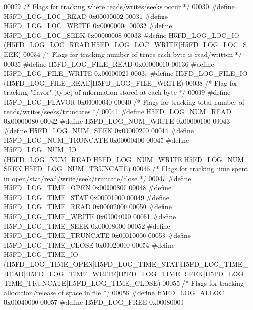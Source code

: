 \begin{DoxyCode}
00029 \textcolor{comment}{/* Flags for tracking where reads/writes/seeks occur */}
00030 \textcolor{preprocessor}{#define H5FD\_LOG\_LOC\_READ   0x00000002}
00031 \textcolor{preprocessor}{#define H5FD\_LOG\_LOC\_WRITE  0x00000004}
00032 \textcolor{preprocessor}{#define H5FD\_LOG\_LOC\_SEEK   0x00000008}
00033 \textcolor{preprocessor}{#define H5FD\_LOG\_LOC\_IO     (H5FD\_LOG\_LOC\_READ|H5FD\_LOG\_LOC\_WRITE|H5FD\_LOG\_LOC\_SEEK)}
00034 \textcolor{comment}{/* Flags for tracking number of times each byte is read/written */}
00035 \textcolor{preprocessor}{#define H5FD\_LOG\_FILE\_READ  0x00000010}
00036 \textcolor{preprocessor}{#define H5FD\_LOG\_FILE\_WRITE 0x00000020}
00037 \textcolor{preprocessor}{#define H5FD\_LOG\_FILE\_IO    (H5FD\_LOG\_FILE\_READ|H5FD\_LOG\_FILE\_WRITE)}
00038 \textcolor{comment}{/* Flag for tracking "flavor" (type) of information stored at each byte */}
00039 \textcolor{preprocessor}{#define H5FD\_LOG\_FLAVOR     0x00000040}
00040 \textcolor{comment}{/* Flags for tracking total number of reads/writes/seeks/truncates */}
00041 \textcolor{preprocessor}{#define H5FD\_LOG\_NUM\_READ   0x00000080}
00042 \textcolor{preprocessor}{#define H5FD\_LOG\_NUM\_WRITE  0x00000100}
00043 \textcolor{preprocessor}{#define H5FD\_LOG\_NUM\_SEEK   0x00000200}
00044 \textcolor{preprocessor}{#define H5FD\_LOG\_NUM\_TRUNCATE 0x00000400}
00045 \textcolor{preprocessor}{#define H5FD\_LOG\_NUM\_IO     (H5FD\_LOG\_NUM\_READ|H5FD\_LOG\_NUM\_WRITE|H5FD\_LOG\_NUM\_SEEK|H5FD\_LOG\_NUM\_TRUNCATE)}
00046 \textcolor{comment}{/* Flags for tracking time spent in open/stat/read/write/seek/truncate/close */}
00047 \textcolor{preprocessor}{#define H5FD\_LOG\_TIME\_OPEN  0x00000800}
00048 \textcolor{preprocessor}{#define H5FD\_LOG\_TIME\_STAT  0x00001000}
00049 \textcolor{preprocessor}{#define H5FD\_LOG\_TIME\_READ  0x00002000}
00050 \textcolor{preprocessor}{#define H5FD\_LOG\_TIME\_WRITE 0x00004000}
00051 \textcolor{preprocessor}{#define H5FD\_LOG\_TIME\_SEEK  0x00008000}
00052 \textcolor{preprocessor}{#define H5FD\_LOG\_TIME\_TRUNCATE 0x00010000}
00053 \textcolor{preprocessor}{#define H5FD\_LOG\_TIME\_CLOSE 0x00020000}
00054 \textcolor{preprocessor}{#define H5FD\_LOG\_TIME\_IO   
       (H5FD\_LOG\_TIME\_OPEN|H5FD\_LOG\_TIME\_STAT|H5FD\_LOG\_TIME\_READ|H5FD\_LOG\_TIME\_WRITE|H5FD\_LOG\_TIME\_SEEK|H5FD\_LOG\_TIME\_TRUNCATE|H5FD\_LOG\_TIME\_CLOSE)}
00055 \textcolor{comment}{/* Flags for tracking allocation/release of space in file */}
00056 \textcolor{preprocessor}{#define H5FD\_LOG\_ALLOC      0x00040000}
00057 \textcolor{preprocessor}{#define H5FD\_LOG\_FREE       0x00080000}

\end{DoxyCode}
